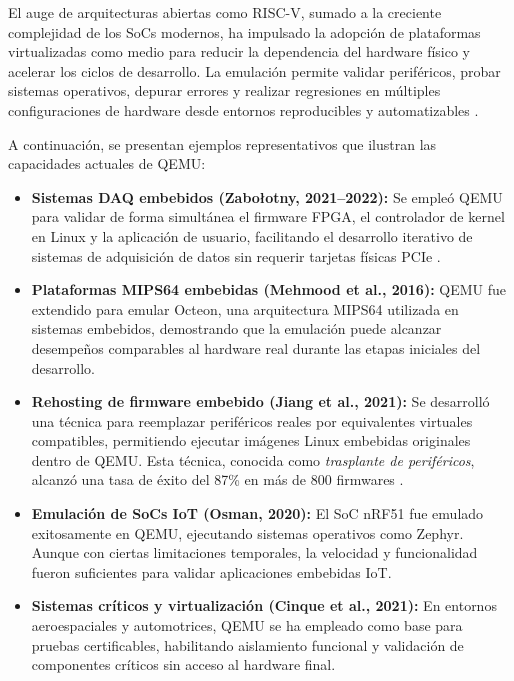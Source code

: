 El auge de arquitecturas abiertas como RISC-V, sumado a la creciente complejidad de los SoCs modernos, ha impulsado la adopción de plataformas virtualizadas como medio para reducir la dependencia del hardware físico y acelerar los ciclos de desarrollo. La emulación permite validar periféricos, probar sistemas operativos, depurar errores y realizar regresiones en múltiples configuraciones de hardware desde entornos reproducibles y automatizables .

A continuación, se presentan ejemplos representativos que ilustran las capacidades actuales de QEMU:

\begin{itemize}
    \item \textbf{Sistemas DAQ embebidos (Zabołotny, 2021–2022):} Se empleó QEMU para validar de forma simultánea el firmware FPGA, el controlador de kernel en Linux y la aplicación de usuario, facilitando el desarrollo iterativo de sistemas de adquisición de datos sin requerir tarjetas físicas PCIe .
    
    \item \textbf{Plataformas MIPS64 embebidas (Mehmood et al., 2016):} QEMU fue extendido para emular Octeon, una arquitectura MIPS64 utilizada en sistemas embebidos, demostrando que la emulación puede alcanzar desempeños comparables al hardware real durante las etapas iniciales del desarrollo.
    
    \item \textbf{Rehosting de firmware embebido (Jiang et al., 2021):} Se desarrolló una técnica para reemplazar periféricos reales por equivalentes virtuales compatibles, permitiendo ejecutar imágenes Linux embebidas originales dentro de QEMU. Esta técnica, conocida como \emph{trasplante de periféricos}, alcanzó una tasa de éxito del 87\% en más de 800 firmwares .
    
    \item \textbf{Emulación de SoCs IoT (Osman, 2020):} El SoC nRF51 fue emulado exitosamente en QEMU, ejecutando sistemas operativos como Zephyr. Aunque con ciertas limitaciones temporales, la velocidad y funcionalidad fueron suficientes para validar aplicaciones embebidas IoT.
    
    \item \textbf{Sistemas críticos y virtualización (Cinque et al., 2021):} En entornos aeroespaciales y automotrices, QEMU se ha empleado como base para pruebas certificables, habilitando aislamiento funcional y validación de componentes críticos sin acceso al hardware final.
\end{itemize}

